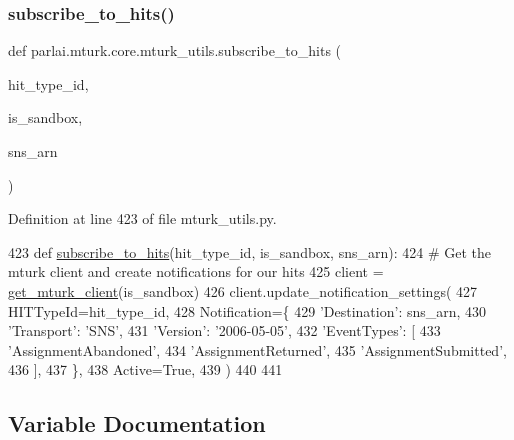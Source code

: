 \subsubsection{\texorpdfstring{subscribe\+\_\+to\+\_\+hits()}{subscribe\_to\_hits()}}
{\footnotesize\ttfamily def parlai.\+mturk.\+core.\+mturk\+\_\+utils.\+subscribe\+\_\+to\+\_\+hits (\begin{DoxyParamCaption}\item[{}]{hit\+\_\+type\+\_\+id,  }\item[{}]{is\+\_\+sandbox,  }\item[{}]{sns\+\_\+arn }\end{DoxyParamCaption})}



Definition at line 423 of file mturk\+\_\+utils.\+py.


\begin{DoxyCode}
423 \textcolor{keyword}{def }\hyperlink{namespaceparlai_1_1mturk_1_1core_1_1mturk__utils_accc5838e30ccf9ab95050ab11ac0d973}{subscribe\_to\_hits}(hit\_type\_id, is\_sandbox, sns\_arn):
424     \textcolor{comment}{# Get the mturk client and create notifications for our hits}
425     client = \hyperlink{namespaceparlai_1_1mturk_1_1core_1_1mturk__utils_a577e2527c04682284394b0951a090695}{get\_mturk\_client}(is\_sandbox)
426     client.update\_notification\_settings(
427         HITTypeId=hit\_type\_id,
428         Notification=\{
429             \textcolor{stringliteral}{'Destination'}: sns\_arn,
430             \textcolor{stringliteral}{'Transport'}: \textcolor{stringliteral}{'SNS'},
431             \textcolor{stringliteral}{'Version'}: \textcolor{stringliteral}{'2006-05-05'},
432             \textcolor{stringliteral}{'EventTypes'}: [
433                 \textcolor{stringliteral}{'AssignmentAbandoned'},
434                 \textcolor{stringliteral}{'AssignmentReturned'},
435                 \textcolor{stringliteral}{'AssignmentSubmitted'},
436             ],
437         \},
438         Active=\textcolor{keyword}{True},
439     )
440 
441 
\end{DoxyCode}


\subsection{Variable Documentation}
\mbox{\label{namespaceparlai_1_1mturk_1_1core_1_1mturk__utils_a88d674a0da32d6e18efb156346c59890}} 
